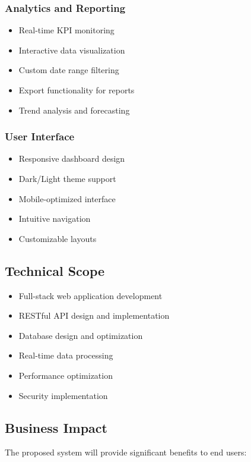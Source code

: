 \documentclass[12pt]{article}
\begin{document}
\subsubsection{Analytics and Reporting}
\begin{itemize}
    \item Real-time KPI monitoring
    \item Interactive data visualization
    \item Custom date range filtering
    \item Export functionality for reports
    \item Trend analysis and forecasting
\end{itemize}

\subsubsection{User Interface}
\begin{itemize}
    \item Responsive dashboard design
    \item Dark/Light theme support
    \item Mobile-optimized interface
    \item Intuitive navigation
    \item Customizable layouts
\end{itemize}

\subsection{Technical Scope}
\begin{itemize}
    \item Full-stack web application development
    \item RESTful API design and implementation
    \item Database design and optimization
    \item Real-time data processing
    \item Performance optimization
    \item Security implementation
\end{itemize}

\subsection{Business Impact}
The proposed system will provide significant benefits to end users:
\end{document}
